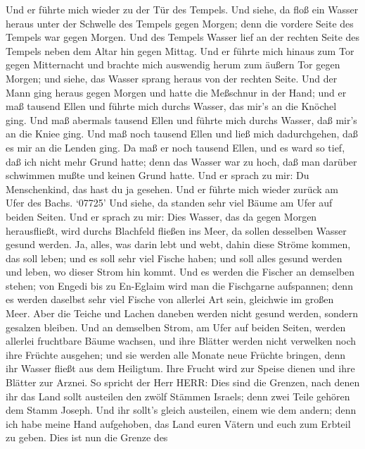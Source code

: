  Und er führte mich wieder zu der Tür des Tempels. Und
siehe, da floß ein Wasser heraus unter der Schwelle des Tempels gegen
Morgen; denn die vordere Seite des Tempels war gegen Morgen. Und des
Tempels Wasser lief an der rechten Seite des Tempels neben dem Altar hin
gegen Mittag.  Und er führte mich hinaus zum Tor gegen
Mitternacht und brachte mich auswendig herum zum äußern Tor gegen
Morgen; und siehe, das Wasser sprang heraus von der rechten Seite.
 Und der Mann ging heraus gegen Morgen und hatte die
Meßschnur in der Hand; und er maß tausend Ellen und führte mich durchs
Wasser, das mir's an die Knöchel ging.  Und maß abermals
tausend Ellen und führte mich durchs Wasser, daß mir's an die Kniee
ging. Und maß noch tausend Ellen und ließ mich dadurchgehen, daß es mir
an die Lenden ging.  Da maß er noch tausend Ellen, und es
ward so tief, daß ich nicht mehr Grund hatte; denn das Wasser war zu
hoch, daß man darüber schwimmen mußte und keinen Grund hatte.
 Und er sprach zu mir: Du Menschenkind, das hast du ja
gesehen. Und er führte mich wieder zurück am Ufer des Bachs.
 `07725' Und siehe, da standen sehr viel Bäume am Ufer auf
beiden Seiten.  Und er sprach zu mir: Dies Wasser, das da
gegen Morgen herausfließt, wird durchs Blachfeld fließen ins Meer, da
sollen desselben Wasser gesund werden.  Ja, alles, was darin
lebt und webt, dahin diese Ströme kommen, das soll leben; und es soll
sehr viel Fische haben; und soll alles gesund werden und leben, wo
dieser Strom hin kommt.  Und es werden die Fischer an
demselben stehen; von Engedi bis zu En-Eglaim wird man die Fischgarne
aufspannen; denn es werden daselbst sehr viel Fische von allerlei Art
sein, gleichwie im großen Meer.  Aber die Teiche und Lachen
daneben werden nicht gesund werden, sondern gesalzen bleiben.
 Und an demselben Strom, am Ufer auf beiden Seiten, werden
allerlei fruchtbare Bäume wachsen, und ihre Blätter werden nicht
verwelken noch ihre Früchte ausgehen; und sie werden alle Monate neue
Früchte bringen, denn ihr Wasser fließt aus dem Heiligtum. Ihre Frucht
wird zur Speise dienen und ihre Blätter zur Arznei.  So
spricht der Herr HERR: Dies sind die Grenzen, nach denen ihr das Land
sollt austeilen den zwölf Stämmen Israels; denn zwei Teile gehören dem
Stamm Joseph.  Und ihr sollt's gleich austeilen, einem wie
dem andern; denn ich habe meine Hand aufgehoben, das Land euren Vätern
und euch zum Erbteil zu geben.  Dies ist nun die Grenze des
